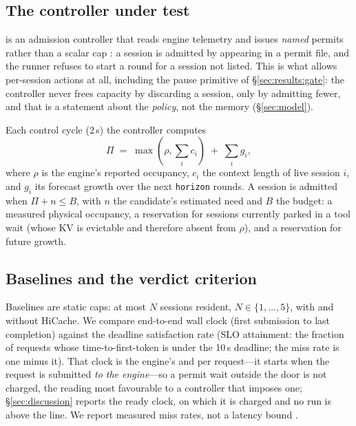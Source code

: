\subsection{The controller under test}

\sys{} is an admission controller that reads engine telemetry and issues
\emph{named} permits rather than a scalar cap \cite{schedconstraints}: a session is admitted by appearing
in a permit file, and the runner refuses to start a round for a session not
listed. This is what allows per-session actions at all, including the pause
primitive of \S\ref{sec:results:gate}: the controller never frees capacity by
discarding a session, only by admitting fewer, and that is a statement about the
\emph{policy}, not the memory (\S\ref{sec:model}).

Each control cycle (2\,s) the controller computes
\begin{equation}
  \Pi \;=\; \max(\rho, \textstyle\sum_i c_i) \;+\; \textstyle\sum_i g_i ,
  \label{eq:proj}
\end{equation}
where $\rho$ is the engine's reported occupancy, $c_i$ the context length of live
session $i$, and $g_i$ its forecast growth over the next \texttt{horizon} rounds.
A session is admitted when $\Pi + n \le B$, with $n$ the candidate's estimated
need and $B$ the budget: a measured physical occupancy, a reservation for
sessions currently parked in a tool wait (whose KV is evictable and therefore
absent from $\rho$), and a reservation for future growth.

\subsection{Baselines and the verdict criterion}

Baselines are static caps: at most $N$ sessions resident, $N \in \{1,\dots,5\}$,
with and without HiCache. We compare end-to-end wall clock (first submission to
last completion) against the deadline satisfaction rate \cite{liu1973} (SLO
attainment: the fraction of requests whose time-to-first-token is under the
10\,s deadline; the miss rate is one minus it). That clock is the engine's and per request---it
starts when the request is submitted \emph{to the engine}---so a permit wait
outside the door is not charged, the reading most favourable to a controller
that imposes one; \S\ref{sec:discussion} reports the ready clock, on which it is
charged and no run is above the line. We report measured miss rates, not a
latency bound \cite{wilhelm2008}.


